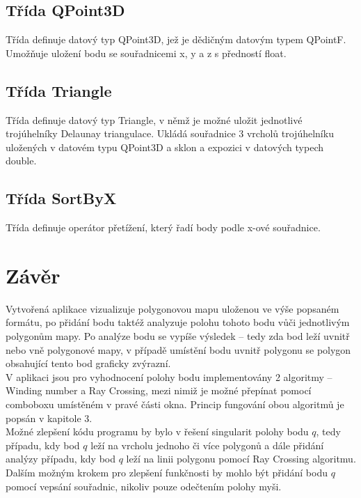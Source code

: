 \documentclass[11pt]{article}
\begin{document}
\subsection{Třída QPoint3D}
Třída definuje datový typ QPoint3D, jež je dědičným datovým typem QPointF. Umožňuje uložení bodu se souřadnicemi x, y a z s předností float.

\subsection{Třída Triangle}
Třída definuje datový typ Triangle, v němž je možné uložit jednotlivé trojúhelníky Delaunay triangulace. Ukládá souřadnice 3 vrcholů trojúhelníku uložených v datovém typu QPoint3D a sklon a expozici v datových typech double.

\subsection{Třída SortByX}
Třída definuje operátor přetížení, který řadí body podle x-ové souřadnice.



\section{Závěr}
Vytvořená aplikace vizualizuje polygonovou mapu uloženou ve výše popsaném formátu, po přidání bodu taktéž analyzuje polohu tohoto bodu vůči jednotlivým polygonům mapy. Po analýze bodu se vypíše výsledek – tedy zda bod leží uvnitř nebo vně polygonové mapy, v případě umístění bodu uvnitř polygonu se polygon obsahující tento bod graficky zvýrazní.\\

 V aplikaci jsou pro vyhodnocení polohy bodu implementovány 2 algoritmy – Winding number a Ray Crossing, mezi nimiž je možné přepínat pomocí comboboxu umístěném v pravé části okna. Princip fungování obou algoritmů je popsán v kapitole 3. \\

Možné zlepšení kódu programu by bylo v řešení singularit polohy bodu $q$, tedy případu, kdy bod $q$ leží na vrcholu jednoho či více polygonů a dále přidání analýzy případu, kdy bod $q$ leží na linii polygonu pomocí Ray Crossing algoritmu. Dalším možným krokem pro zlepšení funkčnosti by mohlo být přidání bodu $q$ pomocí vepsání souřadnic, nikoliv pouze odečtením polohy myši.
\end{document}
